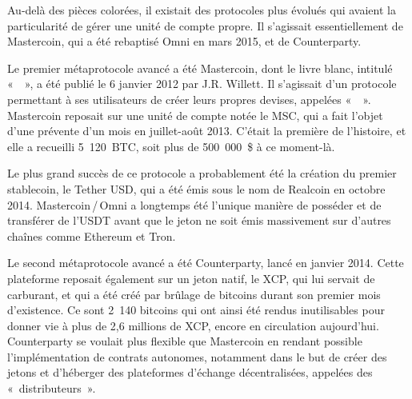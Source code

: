 Au-delà des pièces colorées, il existait des protocoles plus évolués qui avaient la particularité de gérer une unité de compte propre. Il s'agissait essentiellement de Mastercoin, qui a été rebaptisé Omni en mars 2015, et de Counterparty.

Le premier métaprotocole avancé a été Mastercoin, dont le livre blanc, intitulé «~~», a été publié le 6 janvier 2012 par J.R. Willett. Il s'agissait d'un protocole permettant à ses utilisateurs de créer leurs propres devises, appelées «~~». Mastercoin reposait sur une unité de compte notée le MSC, qui a fait l'objet d'une prévente d'un mois en juillet-août 2013. C'était la première  de l'histoire, et elle a recueilli 5~120~BTC, soit plus de 500~000~\$ à ce moment-là.

Le plus grand succès de ce protocole a probablement été la création du premier stablecoin, le Tether USD, qui a été émis sous le nom de Realcoin en octobre 2014. Mastercoin\,/\,Omni a longtemps été l'unique manière de posséder et de transférer de l'USDT avant que le jeton ne soit émis massivement sur d'autres chaînes comme Ethereum et Tron.

Le second métaprotocole avancé a été Counterparty, lancé en janvier 2014. Cette plateforme reposait également sur un jeton natif, le XCP, qui lui servait de carburant, et qui a été créé par brûlage de bitcoins durant son premier mois d'existence. Ce sont 2~140 bitcoins qui ont ainsi été rendus inutilisables pour donner vie à plus de 2,6 millions de XCP, encore en circulation aujourd'hui. Counterparty se voulait plus flexible que Mastercoin en rendant possible l'implémentation de contrats autonomes, notamment dans le but de créer des jetons et d'héberger des plateformes d'échange décentralisées, appelées des «~distributeurs~».

